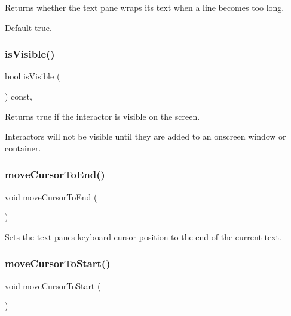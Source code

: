 Returns whether the text pane wraps its text when a line becomes too long. 

Default true. \mbox{\label{classGInteractor_a9d8a6cfb13917785c143e74d40e4e2be}} 
\subsubsection{\texorpdfstring{is\+Visible()}{isVisible()}}
{\footnotesize\ttfamily bool is\+Visible (\begin{DoxyParamCaption}{ }\end{DoxyParamCaption}) const\hspace{0.3cm}{\ttfamily [virtual]}, {\ttfamily [inherited]}}



Returns true if the interactor is visible on the screen. 

Interactors will not be visible until they are added to an onscreen window or container. \mbox{\label{classGBrowserPane_ab5ef729cac166db0ef51ff7ea30d1bb8}} 
\subsubsection{\texorpdfstring{move\+Cursor\+To\+End()}{moveCursorToEnd()}}
{\footnotesize\ttfamily void move\+Cursor\+To\+End (\begin{DoxyParamCaption}{ }\end{DoxyParamCaption})\hspace{0.3cm}{\ttfamily [virtual]}}



Sets the text pane\textquotesingle{}s keyboard cursor position to the end of the current text. 

\mbox{\label{classGBrowserPane_a24abdceab57bcff96185afbadf193a22}} 
\subsubsection{\texorpdfstring{move\+Cursor\+To\+Start()}{moveCursorToStart()}}
{\footnotesize\ttfamily void move\+Cursor\+To\+Start (\begin{DoxyParamCaption}{ }\end{DoxyParamCaption})\hspace{0.3cm}{\ttfamily [virtual]}}



